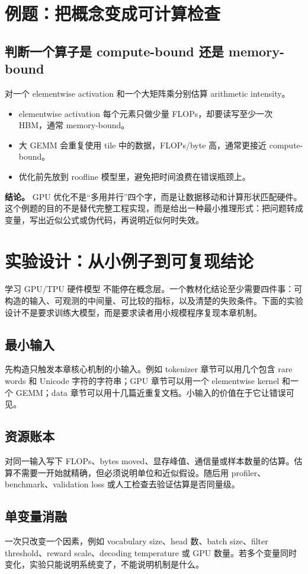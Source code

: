 \documentclass[a4paper]{article}
\begin{document}
\section{例题：把概念变成可计算检查}
\subsection{判断一个算子是 compute-bound 还是 memory-bound}
对一个 elementwise activation 和一个大矩阵乘分别估算 arithmetic intensity。
\begin{itemize}
\item elementwise activation 每个元素只做少量 FLOPs，却要读写至少一次 HBM，通常 memory-bound。
\item 大 GEMM 会重复使用 tile 中的数据，FLOPs/byte 高，通常更接近 compute-bound。
\item 优化前先放到 roofline 模型里，避免把时间浪费在错误瓶颈上。
\end{itemize}
\textbf{结论。} GPU 优化不是“多用并行”四个字，而是让数据移动和计算形状匹配硬件。
这个例题的目的不是替代完整工程实现，而是给出一种最小推理形式：把问题转成变量，写出近似公式或伪代码，再说明近似何时失效。
\section{实验设计：从小例子到可复现结论}
学习 GPU/TPU 硬件模型 不能停在概念层。一个教材化结论至少需要四件事：可构造的输入、可观测的中间量、可比较的指标，以及清楚的失败条件。下面的实验设计不是要求训练大模型，而是要求读者用小规模程序复现本章机制。
\subsection{最小输入}
先构造只触发本章核心机制的小输入。例如 tokenizer 章节可以用几个包含 rare words 和 Unicode 字符的字符串；GPU 章节可以用一个 elementwise kernel 和一个 GEMM；data 章节可以用十几篇近重复文档。小输入的价值在于它让错误可见。
\subsection{资源账本}
对同一输入写下 FLOPs、bytes moved、显存峰值、通信量或样本数量的估算。估算不需要一开始就精确，但必须说明单位和近似假设。随后用 profiler、benchmark、validation loss 或人工检查去验证估算是否同量级。
\subsection{单变量消融}
一次只改变一个因素，例如 vocabulary size、head 数、batch size、filter threshold、reward scale、decoding temperature 或 GPU 数量。若多个变量同时变化，实验只能说明系统变了，不能说明机制是什么。
\end{document}
